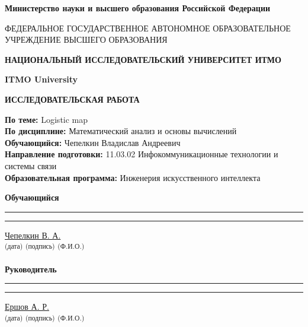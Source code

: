 \documentclass[14pt,a4paper]{extarticle}
\begin{document}
\thispagestyle{empty} %
\begin{center}
    \textbf{Министерство науки и высшего образования Российской Федерации}
    
    \vspace{5pt}

    ФЕДЕРАЛЬНОЕ ГОСУДАРСТВЕННОЕ АВТОНОМНОЕ ОБРАЗОВАТЕЛЬНОЕ УЧРЕЖДЕНИЕ ВЫСШЕГО ОБРАЗОВАНИЯ
    
    \vspace{5pt}
    
    \textbf{НАЦИОНАЛЬНЫЙ ИССЛЕДОВАТЕЛЬСКИЙ УНИВЕРСИТЕТ ИТМО}
    
    \vspace{5pt}
    
    \textbf{ITMO University}

    \vspace{15pt}

    \textbf{ИССЛЕДОВАТЕЛЬСКАЯ РАБОТА}
\end{center}

\begin{flushleft}
    \textbf{По теме:} Logistic map \\
    \textbf{По дисциплине:} Математический анализ и основы вычислений \\
    \textbf{Обучающийся:} Чепелкин Владислав Андреевич \\
    \textbf{Направление подготовки:} 11.03.02 Инфокоммуникационные технологии и системы связи \\
    \textbf{Образовательная программа:} Инженерия искусственного интеллекта
    
    \vspace{1cm}
    \textbf{Обучающийся}\qquad\rule{3.1cm}{0.01mm}\qquad\rule{2.5cm}{0.01mm}
    \quad\quad\underline{Чепелкин В. А.} \\
    \hspace{5.6cm}\textsuperscript{(дата)}
    \hspace{2.4cm}\textsuperscript{(подпись)}
    \hspace{2.1cm}\textsuperscript{(Ф.И.О.)}
    
    \textbf{Руководитель}\quad\quad\rule{3.1cm}{0.01mm}\quad\quad\rule{2.5cm}{0.01mm}
    \qquad\underline{Ершов А. Р.} \\
    \hspace{5.6cm}\textsuperscript{(дата)}
    \hspace{2.4cm}\textsuperscript{(подпись)}
    \hspace{2.1cm}\textsuperscript{(Ф.И.О.)}
\end{flushleft}
\end{document}
